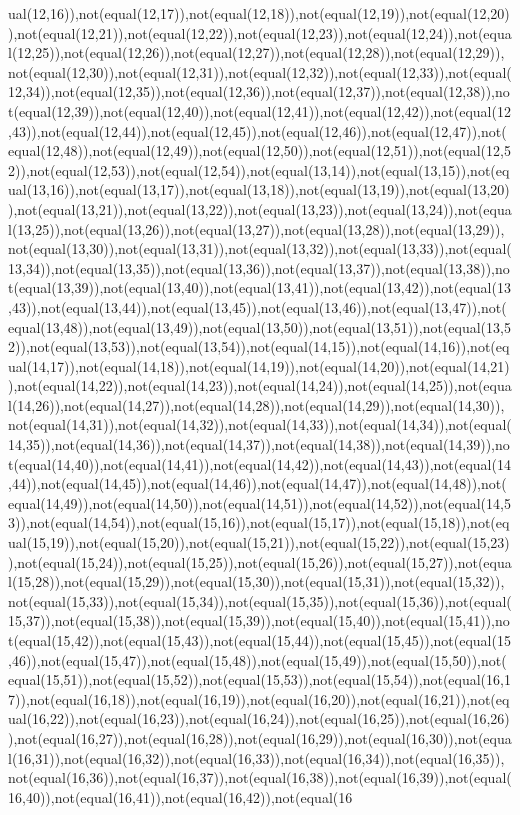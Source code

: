 ual(12,16)),not(equal(12,17)),not(equal(12,18)),not(equal(12,19)),not(equal(12,20)),not(equal(12,21)),not(equal(12,22)),not(equal(12,23)),not(equal(12,24)),not(equal(12,25)),not(equal(12,26)),not(equal(12,27)),not(equal(12,28)),not(equal(12,29)),not(equal(12,30)),not(equal(12,31)),not(equal(12,32)),not(equal(12,33)),not(equal(12,34)),not(equal(12,35)),not(equal(12,36)),not(equal(12,37)),not(equal(12,38)),not(equal(12,39)),not(equal(12,40)),not(equal(12,41)),not(equal(12,42)),not(equal(12,43)),not(equal(12,44)),not(equal(12,45)),not(equal(12,46)),not(equal(12,47)),not(equal(12,48)),not(equal(12,49)),not(equal(12,50)),not(equal(12,51)),not(equal(12,52)),not(equal(12,53)),not(equal(12,54)),not(equal(13,14)),not(equal(13,15)),not(equal(13,16)),not(equal(13,17)),not(equal(13,18)),not(equal(13,19)),not(equal(13,20)),not(equal(13,21)),not(equal(13,22)),not(equal(13,23)),not(equal(13,24)),not(equal(13,25)),not(equal(13,26)),not(equal(13,27)),not(equal(13,28)),not(equal(13,29)),not(equal(13,30)),not(equal(13,31)),not(equal(13,32)),not(equal(13,33)),not(equal(13,34)),not(equal(13,35)),not(equal(13,36)),not(equal(13,37)),not(equal(13,38)),not(equal(13,39)),not(equal(13,40)),not(equal(13,41)),not(equal(13,42)),not(equal(13,43)),not(equal(13,44)),not(equal(13,45)),not(equal(13,46)),not(equal(13,47)),not(equal(13,48)),not(equal(13,49)),not(equal(13,50)),not(equal(13,51)),not(equal(13,52)),not(equal(13,53)),not(equal(13,54)),not(equal(14,15)),not(equal(14,16)),not(equal(14,17)),not(equal(14,18)),not(equal(14,19)),not(equal(14,20)),not(equal(14,21)),not(equal(14,22)),not(equal(14,23)),not(equal(14,24)),not(equal(14,25)),not(equal(14,26)),not(equal(14,27)),not(equal(14,28)),not(equal(14,29)),not(equal(14,30)),not(equal(14,31)),not(equal(14,32)),not(equal(14,33)),not(equal(14,34)),not(equal(14,35)),not(equal(14,36)),not(equal(14,37)),not(equal(14,38)),not(equal(14,39)),not(equal(14,40)),not(equal(14,41)),not(equal(14,42)),not(equal(14,43)),not(equal(14,44)),not(equal(14,45)),not(equal(14,46)),not(equal(14,47)),not(equal(14,48)),not(equal(14,49)),not(equal(14,50)),not(equal(14,51)),not(equal(14,52)),not(equal(14,53)),not(equal(14,54)),not(equal(15,16)),not(equal(15,17)),not(equal(15,18)),not(equal(15,19)),not(equal(15,20)),not(equal(15,21)),not(equal(15,22)),not(equal(15,23)),not(equal(15,24)),not(equal(15,25)),not(equal(15,26)),not(equal(15,27)),not(equal(15,28)),not(equal(15,29)),not(equal(15,30)),not(equal(15,31)),not(equal(15,32)),not(equal(15,33)),not(equal(15,34)),not(equal(15,35)),not(equal(15,36)),not(equal(15,37)),not(equal(15,38)),not(equal(15,39)),not(equal(15,40)),not(equal(15,41)),not(equal(15,42)),not(equal(15,43)),not(equal(15,44)),not(equal(15,45)),not(equal(15,46)),not(equal(15,47)),not(equal(15,48)),not(equal(15,49)),not(equal(15,50)),not(equal(15,51)),not(equal(15,52)),not(equal(15,53)),not(equal(15,54)),not(equal(16,17)),not(equal(16,18)),not(equal(16,19)),not(equal(16,20)),not(equal(16,21)),not(equal(16,22)),not(equal(16,23)),not(equal(16,24)),not(equal(16,25)),not(equal(16,26)),not(equal(16,27)),not(equal(16,28)),not(equal(16,29)),not(equal(16,30)),not(equal(16,31)),not(equal(16,32)),not(equal(16,33)),not(equal(16,34)),not(equal(16,35)),not(equal(16,36)),not(equal(16,37)),not(equal(16,38)),not(equal(16,39)),not(equal(16,40)),not(equal(16,41)),not(equal(16,42)),not(equal(16